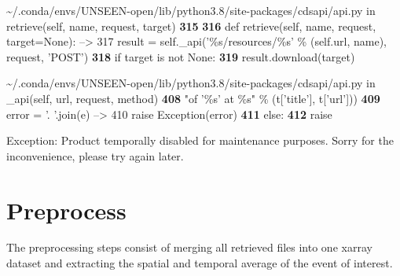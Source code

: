 \documentclass[letterpaper,10pt,english]{sphinxmanual}
\begin{document}
{\begin{sphinxVerbatim}[commandchars=\\\{\}]
\textcolor{ansi-green}{\textasciitilde{}/.conda/envs/UNSEEN-open/lib/python3.8/site-packages/cdsapi/api.py} in \textcolor{ansi-cyan}{retrieve}\textcolor{ansi-blue}{(self, name, request, target)}
\textcolor{ansi-green-intense}{\textbf{    315}}
\textcolor{ansi-green-intense}{\textbf{    316}}     \textcolor{ansi-green}{def} retrieve\textcolor{ansi-blue}{(}self\textcolor{ansi-blue}{,} name\textcolor{ansi-blue}{,} request\textcolor{ansi-blue}{,} target\textcolor{ansi-blue}{=}\textcolor{ansi-green}{None}\textcolor{ansi-blue}{)}\textcolor{ansi-blue}{:}
\textcolor{ansi-green}{--> 317}\textcolor{ansi-red}{         }result \textcolor{ansi-blue}{=} self\textcolor{ansi-blue}{.}\_api\textcolor{ansi-blue}{(}\textcolor{ansi-blue}{'\%s/resources/\%s'} \textcolor{ansi-blue}{\%} \textcolor{ansi-blue}{(}self\textcolor{ansi-blue}{.}url\textcolor{ansi-blue}{,} name\textcolor{ansi-blue}{)}\textcolor{ansi-blue}{,} request\textcolor{ansi-blue}{,} \textcolor{ansi-blue}{'POST'}\textcolor{ansi-blue}{)}
\textcolor{ansi-green-intense}{\textbf{    318}}         \textcolor{ansi-green}{if} target \textcolor{ansi-green}{is} \textcolor{ansi-green}{not} \textcolor{ansi-green}{None}\textcolor{ansi-blue}{:}
\textcolor{ansi-green-intense}{\textbf{    319}}             result\textcolor{ansi-blue}{.}download\textcolor{ansi-blue}{(}target\textcolor{ansi-blue}{)}

\textcolor{ansi-green}{\textasciitilde{}/.conda/envs/UNSEEN-open/lib/python3.8/site-packages/cdsapi/api.py} in \textcolor{ansi-cyan}{\_api}\textcolor{ansi-blue}{(self, url, request, method)}
\textcolor{ansi-green-intense}{\textbf{    408}}                                  "of '\%s' at \%s" \% (t['title'], t['url']))
\textcolor{ansi-green-intense}{\textbf{    409}}                     error \textcolor{ansi-blue}{=} \textcolor{ansi-blue}{'. '}\textcolor{ansi-blue}{.}join\textcolor{ansi-blue}{(}e\textcolor{ansi-blue}{)}
\textcolor{ansi-green}{--> 410}\textcolor{ansi-red}{                 }\textcolor{ansi-green}{raise} Exception\textcolor{ansi-blue}{(}error\textcolor{ansi-blue}{)}
\textcolor{ansi-green-intense}{\textbf{    411}}             \textcolor{ansi-green}{else}\textcolor{ansi-blue}{:}
\textcolor{ansi-green-intense}{\textbf{    412}}                 \textcolor{ansi-green}{raise}

\textcolor{ansi-red}{Exception}: Product temporally disabled for maintenance purposes. Sorry for the inconvenience, please try again later.
\end{sphinxVerbatim}
}


\chapter{Preprocess}
\label{\detokenize{Notebooks/2.Preprocess/2.Preprocess:Preprocess}}\label{\detokenize{Notebooks/2.Preprocess/2.Preprocess::doc}}
The preprocessing steps consist of merging all retrieved files into one xarray dataset and extracting the spatial and temporal average of the event of interest.
\end{document}
